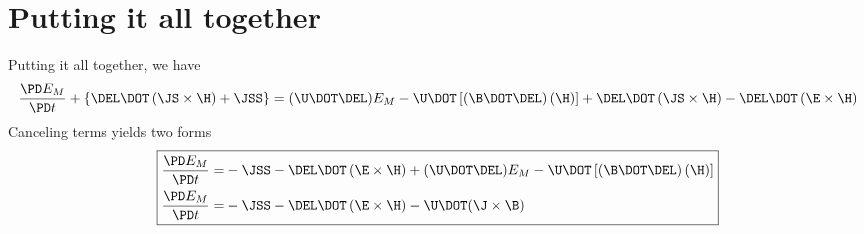 \documentclass[11pt]{article}
\begin{document}
\section{Putting it all together}
Putting it all together, we have
\begin{equation}
	\frac{\PD E_M}{\PD t} +
	\left\{ \DEL \DOT \left(\JS \times \H \right) + \JSS \right\} =
	(\U \DOT \DEL) E_M
	- \U \DOT \left[(\B \DOT \DEL) \left( \H \right) \right]
	+ \DEL \DOT \left(\JS \times \H \right)
	- \DEL \DOT \left(\E \times \H \right)
\end{equation}
Canceling terms yields two forms
\begin{equation}\boxed{\begin{aligned}
	\frac{\PD E_M}{\PD t} = &
	- \JSS
	- \DEL \DOT \left(\E \times \H \right)
	+ (\U \DOT \DEL) E_M
	- \U \DOT \left[(\B \DOT \DEL) \left( \H \right) \right]  \\
	\frac{\PD E_M}{\PD t} = &
	- \JSS
	- \DEL \DOT \left(\E \times \H \right)
	- \U \DOT (\J \times \B)
\end{aligned}}\end{equation}
\end{document}
